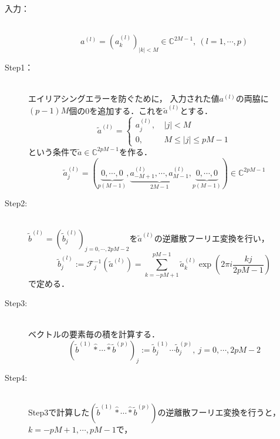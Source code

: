 \documentclass[11pt,a4paper]{jsarticle}
\theoremstyle{definition}
\begin{document}
\begin{description}
  \item[入力：]
    \quad \\
    \begin{equation*}
      a^{(l)} = \left( a_k^{(l)} \right)_{|k|<M}\in\mathbb{C}^{2M-1},\ (l=1,\cdots,p)
    \end{equation*}
  \item[Step1：]
    \quad \\
    エイリアシングエラーを防ぐために， 入力された値$a^{(l)}$の両脇に$(p-1)M$個の0を追加する．これを$\tilde{a}^{(l)}$とする．
    \begin{equation*}
      \tilde{a}^{(l)} = \begin{cases}
        a_j^{(l)} ,\  & |j|<M               \\
        0,\           & M\leq |j| \leq pM-1
      \end{cases}
    \end{equation*}
    という条件で$\tilde{a} \in \mathbb{C}^{2pM-1}$を作る．
    \begin{equation*}
      \tilde{a}_j^{(l)} = ( \underbrace{0,\cdots,0}_{p(M-1)},\underbrace{a_{-M+1}^{(l)},\cdots,a_{M-1}^{(l)}}_{2M-1},\underbrace{0,\cdots,0}_{p(M-1)} ) \in \mathbb{C}^{2pM-1}
    \end{equation*}
  \item[Step2:]
    \quad \\
    $\tilde{b}^{(l)} = \left( \tilde{b}_j^{(l)} \right)_{j=0,\cdots,2pM-2}$を$\tilde{a}^{(l)}$の逆離散フーリエ変換を行い，
    \begin{equation*}
      \tilde{b}_j^{(l)} := \mathcal{F}_j^{-1} \left( \tilde{a}^{(l)} \right) = \sum_{k=-pM+1}^{pM-1} \tilde{a}_k^{(l)} \exp\left(2\pi i \frac{kj}{2pM-1}\right)
    \end{equation*}
    で定める．
  \item[Step3:]
    \quad \\
    ベクトルの要素毎の積を計算する．
    \begin{equation*}
      \left( \tilde{b}^{(1)} \hat{*} \cdots \hat{*} \tilde{b}^{(p)} \right)_j := \tilde{b}_j^{(1)} \cdots \tilde{b}_j^{(p)},\ j=0,\cdots,2pM-2
    \end{equation*}
  \item[Step4:]
    \quad \\
    Step3で計算した$\left( \tilde{b}^{(1)} \hat{*} \cdots \hat{*} \tilde{b}^{(p)} \right)$の逆離散フーリエ変換を行うと，$k=-pM+1,\cdots,pM-1$で，
    \begin{align*}

\end{align*}
\end{description}
\end{document}
